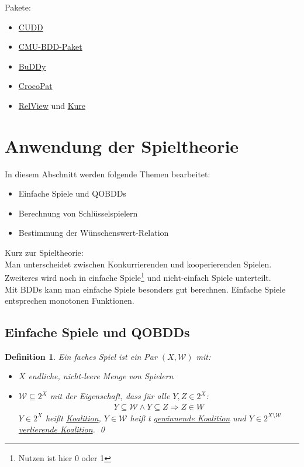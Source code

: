 \documentclass[ngerman]{scrartcl}
\theoremstyle{custom}
\newtheorem{mdef}{Definition} \numberwithin{mdef}{subsection}
\newcommand{\0}{\mathbf{0}}
\newcommand{\1}{\mathbf{L}}
\begin{document}
Pakete:
\begin{itemize}
\item[(1)] \href{http://vlsi.colorado.edu/~fabio/CUDD/}{CUDD}
\item[(2)] \href{http://www.cs.cmu.edu/~modelcheck/bdd.html}{CMU-BDD-Paket}
\item[(3)] \href{http://buddy.sourceforge.net/manual/main.html}{BuDDy}
\item[(4)] \href{http://www.sosy-lab.org/~dbeyer/CrocoPat/}{CrocoPat}
\item[(5)] \href{http://www.informatik.uni-kiel.de/~progsys/relview/}{RelView} und \href{http://korsika.informatik.uni-kiel.de/kure2/}{Kure}
\end{itemize}

\newpage

\section{Anwendung der Spieltheorie}
In diesem Abschnitt werden folgende Themen bearbeitet:
\begin{itemize}
\item Einfache Spiele und QOBDDs
\item Berechnung von Schl\"usselspielern
\item Bestimmung der W\"unschenswert-Relation
\end{itemize}

Kurz zur Spieltheorie:\\
Man unterscheidet zwischen Konkurrierenden und kooperierenden
Spielen. Zweiteres wird noch in einfache Spiele\footnote{Nutzen ist
  hier 0 oder 1} und nicht-einfach Spiele unterteilt.\\
Mit BDDs kann man einfache Spiele besonders gut berechnen. Einfache
Spiele entsprechen monotonen Funktionen.

\subsection{Einfache Spiele und QOBDDs}
\begin{mdef}
Ein faches Spiel ist ein Par $(X,\mathcal{W})$ mit:
\begin{itemize}
\item[(1)] $X$ endliche, nicht-leere Menge von Spielern
\item[(2)] $\mathcal{W} \subseteq 2^X$ mit der Eigenschaft, dass f\"ur
  alle $Y,Z \in 2^X$:
\begin{align*}
Y \subseteq \mathcal{W} \wedge Y \subseteq Z \Rightarrow Z \in W
\end{align*}
$Y \in 2^X$ hei\ss t \underline{Koalition}, $Y \in \mathcal{W}$ hei\ss
t \underline{gewinnende Koalition} und $Y \in 2^{X \setminus
  \mathcal{W}}$ \underline{verlierende Koalition}.
\qed
\end{itemize}
\end{mdef}
\end{document}
